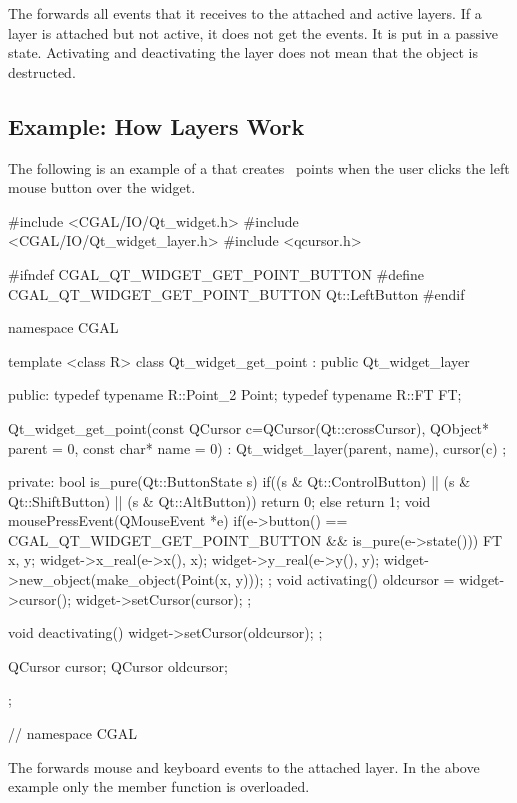 
The  forwards all events that it receives to the
attached and active layers. If a layer is attached but not active, it
does not get the events. It is put in a passive state. Activating and
deactivating the layer does not mean that the object is destructed.

\subsection{Example: How Layers Work}

The following is an example of a  that creates \cgal\ points when
the user clicks the left mouse button over the widget. 
 
\begin{ccExampleCode}
#include <CGAL/IO/Qt_widget.h>
#include <CGAL/IO/Qt_widget_layer.h>
#include <qcursor.h>

#ifndef CGAL_QT_WIDGET_GET_POINT_BUTTON
#define CGAL_QT_WIDGET_GET_POINT_BUTTON Qt::LeftButton
#endif

namespace CGAL {
template <class R>
class Qt_widget_get_point : public Qt_widget_layer
{
public:
  typedef typename R::Point_2   Point;
  typedef typename R::FT        FT;
  
  Qt_widget_get_point(const QCursor c=QCursor(Qt::crossCursor),
                      QObject* parent = 0, const char* name = 0) :
    Qt_widget_layer(parent, name), cursor(c) {};
  
private:
  bool is_pure(Qt::ButtonState s){
    if((s & Qt::ControlButton) ||
       (s & Qt::ShiftButton) ||
       (s & Qt::AltButton))
      return 0;
    else
      return 1;
  }
  void mousePressEvent(QMouseEvent *e)
  {
    if(e->button() == CGAL_QT_WIDGET_GET_POINT_BUTTON
       && is_pure(e->state()))
    {
      FT x, y;
      widget->x_real(e->x(), x);
      widget->y_real(e->y(), y);
      widget->new_object(make_object(Point(x, y)));
    }
  };
  void activating()
  {
    oldcursor = widget->cursor();
    widget->setCursor(cursor);
  };
  
  void deactivating()
  {
    widget->setCursor(oldcursor);
  };

  QCursor cursor;
  QCursor oldcursor;
};
} // namespace CGAL
\end{ccExampleCode}

The  forwards mouse and keyboard events to the attached layer.
In the above example only the  member function is overloaded.

